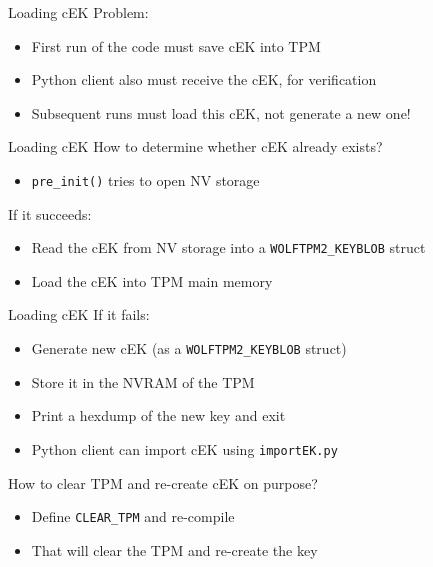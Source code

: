 \begin{frame}{Loading cEK}
Problem:
\begin{itemize}
\item First run of the code must save cEK into TPM
\item Python client also must receive the cEK, for verification
\item Subsequent runs must load this cEK, not generate a new one!
\end{itemize}
\end{frame}

\begin{frame}{Loading cEK}
How to determine whether cEK already exists?
\begin{itemize}
\item \texttt{pre\_init()} tries to open NV storage
\end{itemize}

If it succeeds:
\begin{itemize}
\item Read the cEK from NV storage into a \texttt{WOLFTPM2\_KEYBLOB} struct
\item Load the cEK into TPM main memory
\end{itemize}
\end{frame}

\begin{frame}{Loading cEK}
If it fails:

\begin{itemize}
\item Generate new cEK (as a \texttt{WOLFTPM2\_KEYBLOB} struct)
\item Store it in the NVRAM of the TPM
\item Print a hexdump of the new key and exit
\item Python client can import cEK using \texttt{importEK.py}
\end{itemize}

How to clear TPM and re-create cEK on purpose?

\begin{itemize}
\item Define \texttt{CLEAR\_TPM} and re-compile
\item That will clear the TPM and re-create the key
\end{itemize}
\end{frame}

%
